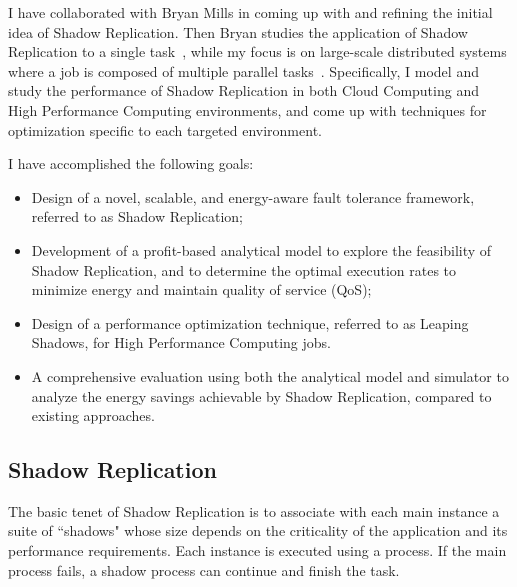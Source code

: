 I have collaborated with Bryan Mills in coming up with and refining the initial idea of Shadow Replication. Then Bryan studies the application of Shadow Replication to a single task~\cite{mills2014shadow}, while my focus is on large-scale distributed systems where a job is composed of multiple parallel tasks~\cite{cui_en7085151,cui_closer_2014}. Specifically, I model and study the performance of Shadow Replication in both Cloud Computing and High Performance Computing environments, and come up with techniques for optimization specific to each targeted environment. 

I have accomplished the following goals:
\begin{itemize}
	\item Design of a novel, scalable, and energy-aware fault tolerance framework, referred to as Shadow Replication;

	\item Development of a profit-based analytical model to explore the feasibility of
	  Shadow Replication, and to determine the optimal
	  execution rates to minimize energy and maintain quality of service (QoS);


    \item Design of a performance optimization technique, referred to as Leaping Shadows, for High Performance Computing jobs.
	\item A comprehensive evaluation using both the analytical model and simulator to analyze the
	energy savings achievable by Shadow Replication, compared to existing approaches.
\end{itemize}


\subsection{Shadow Replication}
The basic tenet of Shadow Replication is to associate with each main instance a suite of ``shadows" whose size depends on the criticality of the application and its performance requirements. Each instance is executed using a process. 
If the main process fails, a shadow process can continue and finish the task.

